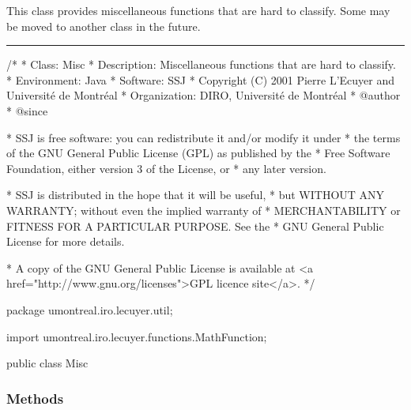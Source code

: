 
This class provides miscellaneous functions that are hard to classify.
Some may be moved to another class in the future.

\bigskip\hrule

\begin{code}\begin{hide}
/*
 * Class:        Misc
 * Description:  Miscellaneous functions that are hard to classify.
 * Environment:  Java
 * Software:     SSJ 
 * Copyright (C) 2001  Pierre L'Ecuyer and Université de Montréal
 * Organization: DIRO, Université de Montréal
 * @author       
 * @since

 * SSJ is free software: you can redistribute it and/or modify it under
 * the terms of the GNU General Public License (GPL) as published by the
 * Free Software Foundation, either version 3 of the License, or
 * any later version.

 * SSJ is distributed in the hope that it will be useful,
 * but WITHOUT ANY WARRANTY; without even the implied warranty of
 * MERCHANTABILITY or FITNESS FOR A PARTICULAR PURPOSE.  See the
 * GNU General Public License for more details.

 * A copy of the GNU General Public License is available at
   <a href="http://www.gnu.org/licenses">GPL licence site</a>.
 */
\end{hide}
package umontreal.iro.lecuyer.util;\begin{hide}

import umontreal.iro.lecuyer.functions.MathFunction;\end{hide}


public class Misc\begin{hide} {
   private Misc() {}\end{hide}
\end{code}

\subsubsection* {Methods}

